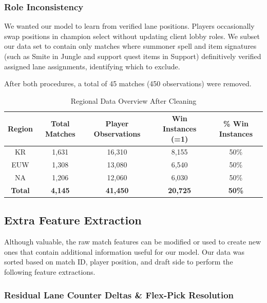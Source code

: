 \documentclass[11pt,letterpaper]{article}
\begin{document}
\subsubsection{Role Inconsistency}

We wanted our model to learn from verified lane positions. Players occasionally swap positions in champion select without updating client lobby roles. We subset our data set to contain only matches where summoner spell and item signatures (such as Smite in Jungle and support quest items in Support) definitively verified assigned lane assignments, identifying which to exclude.

After both procedures, a total of 45 matches (450 observations) were removed.

\begin{table}[h]
\centering
\caption{Regional Data Overview After Cleaning}
\label{tab:after_cleaning}
\small
\begin{tabular}{ccccc}
\toprule
\textbf{Region} & \textbf{Total Matches} & \textbf{Player Observations} & \textbf{Win Instances (=1)} & \textbf{\% Win Instances} \\
\midrule
KR & 1,631 & 16,310 & 8,155 & 50\% \\
EUW & 1,308 & 13,080 & 6,540 & 50\% \\
NA & 1,206 & 12,060 & 6,030 & 50\% \\
\midrule
\textbf{Total} & \textbf{4,145} & \textbf{41,450} & \textbf{20,725} & \textbf{50\%} \\
\bottomrule
\end{tabular}
\end{table}

\subsection{Extra Feature Extraction}

Although valuable, the raw match features can be modified or used to create new ones that contain additional information useful for our model. Our data was sorted based on match ID, player position, and draft side to perform the following feature extractions.

\clearpage

\subsubsection{Residual Lane Counter Deltas \& Flex-Pick Resolution}
\end{document}
